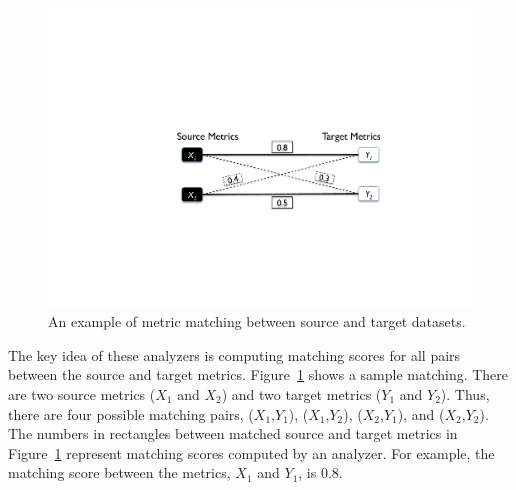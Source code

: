 


\begin{figure}[t]
	\centering
	\includegraphics[width=\linewidth]{Figures/matching.pdf}
	\caption{An example of metric matching between source and target
	datasets.}
	\label{fig:matching}
\end{figure}

The key idea of these analyzers is computing matching
scores for all pairs between the source and target metrics.
Figure~\ref{fig:matching} shows a sample
matching. There are two source metrics ($X_1$ and $X_2$) and
two target metrics ($Y_1$ and $Y_2$). Thus, there are four possible matching
pairs, ($X_1$,$Y_1$), ($X_1$,$Y_2$), ($X_2$,$Y_1$), and ($X_2$,$Y_2$). The
numbers in rectangles between matched source and target metrics in
Figure~\ref{fig:matching} represent matching scores computed by an analyzer. For example,
the matching score between the metrics, $X_1$ and $Y_1$, is 0.8.

